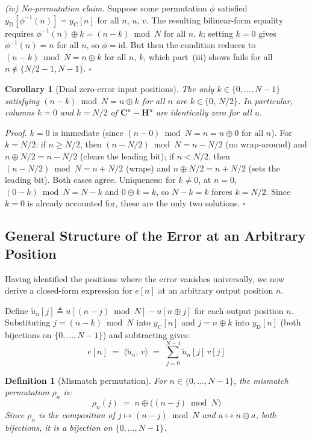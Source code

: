 \documentclass[10pt,a4paper]{amsart}
\newtheorem{corollary}[theorem]{Corollary}
\newtheorem{definition}[theorem]{Definition}
\begin{document}
\smallskip
\noindent\textit{(iv) No-permutation claim.} Suppose some permutation $\phi$ satisfied $y_{\mathrm{D}}[\phi^{-1}(n)] = y_{\mathrm{C}}[n]$ for all $n$, $u$, $v$. The resulting bilinear-form equality requires $\phi^{-1}(n)\oplus k = (n-k)\bmod N$ for all $n$, $k$; setting $k=0$ gives $\phi^{-1}(n)=n$ for all $n$, so $\phi=\mathrm{id}$. But then the condition reduces to $(n-k)\bmod N = n\oplus k$ for all $n$, $k$, which part~(iii) shows fails for all $n\notin\{N/2-1,N-1\}$. $\square$

\medskip
\begin{corollary}[Dual zero-error input positions]\label{cor:dual-input}
The only $k \in \{0,\ldots,N-1\}$ satisfying $(n-k)\bmod N = n \oplus k$ for all $n$ are $k \in \{0,\,N/2\}$. In particular, columns $k=0$ and $k=N/2$ of $\mathbf{C}^u-\mathbf{H}^u$ are identically zero for all $u$.
\end{corollary}

\noindent\textit{Proof.} $k=0$ is immediate (since $(n-0)\bmod N = n = n\oplus 0$ for all $n$). For $k=N/2$: if $n \geq N/2$, then $(n-N/2)\bmod N = n-N/2$ (no wrap-around) and $n\oplus N/2 = n-N/2$ (clears the leading bit); if $n < N/2$, then $(n-N/2)\bmod N = n+N/2$ (wraps) and $n\oplus N/2 = n+N/2$ (sets the leading bit). Both cases agree. Uniqueness: for $k\neq 0$, at $n=0$, $(0-k)\bmod N = N-k$ and $0\oplus k = k$, so $N-k=k$ forces $k=N/2$. Since $k=0$ is already accounted for, these are the only two solutions. $\square$

\subsection{General Structure of the Error at an Arbitrary Position}
\label{sec:general-structure}

Having identified the positions where the error vanishes universally, we now derive a closed-form expression for $e[n]$ at an arbitrary output position $n$.

\noindent Define $\tilde{u}_n[j] \triangleq u[(n-j)\bmod N] - u[n \oplus j]$ for each output position $n$. Substituting $j=(n-k)\bmod N$ into $y_{\mathrm{C}}[n]$ and $j=n\oplus k$ into $y_{\mathrm{D}}[n]$ (both bijections on $\{0,\ldots,N-1\}$) and subtracting gives:
\begin{equation}
    \label{eq:general-closed-form}
    e[n] \;=\; \langle \tilde{u}_n,\, v \rangle \;=\; \sum_{j=0}^{N-1} \tilde{u}_n[j]\, v[j]
\end{equation}

\medskip
\begin{definition}[Mismatch permutation]\label{def:rho}
For $n \in \{0,\ldots,N-1\}$, the \emph{mismatch permutation} $\rho_n$ is:
\begin{equation}
    \label{eq:rho-def}
    \rho_n(j) \;=\; n \oplus \bigl((n-j)\bmod N\bigr)
\end{equation}
Since $\rho_n$ is the composition of $j\mapsto(n-j)\bmod N$ and $a\mapsto n\oplus a$, both bijections, it is a bijection on $\{0,\ldots,N-1\}$.
\end{definition}
\end{document}
